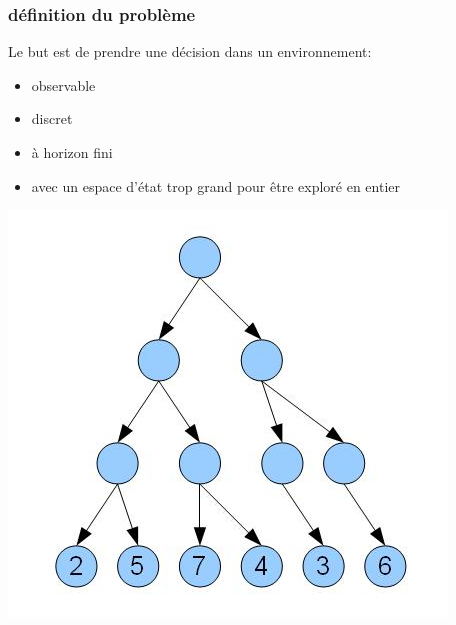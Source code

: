 \documentclass{beamer}
\begin{document}
\begin{frame}
    \frametitle{définition du problème}
    Le but est de prendre une décision dans un environnement:
    \begin{itemize}
        \item observable
        \item discret
        \item à horizon fini
        \item avec un espace d'état trop grand pour être exploré en entier
    \end{itemize}

    \begin{center}
        \includegraphics[scale=0.3]{arbre.jpg}
    \end{center}

\end{frame}
\end{document}
